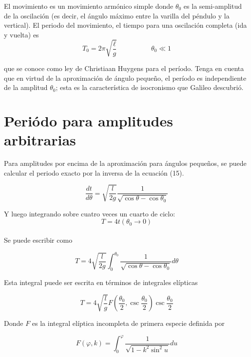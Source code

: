 \documentclass[12pt]{article}
\begin{document}
El movimiento es un movimiento armónico simple donde $\theta_0$ es la semi-amplitud de la oscilación (es decir, el ángulo máximo entre la varilla del péndulo y la vertical). El periodo del movimiento, el tiempo para una oscilación completa (ida y vuelta) es
\begin{equation}
T_0 = 2 \pi \sqrt {\frac {\ell} {g}} \quad \quad \quad \quad \quad \theta_0 \ll 1
\end{equation}

que se conoce como ley de Christiaan Huygens para el período. Tenga en cuenta que en virtud de la aproximación de ángulo pequeño, el período es independiente de la amplitud $\theta_0$; esta es la característica de isocronismo que Galileo descubrió.
\section{Periódo para amplitudes arbitrarias}
Para amplitudes por encima de la aproximación para ángulos pequeños, se puede calcular el periodo exacto por la inversa de la ecuación (15).

\begin{equation}
\frac{dt}{d\theta}= \sqrt{\frac{l}{2g}} \frac{1}{\sqrt{\cos\theta - \cos \theta_0}}
\end{equation}
 
Y luego integrando sobre cuatro veces un cuarto de ciclo:\\
 
$$T=4t(\theta_0 \rightarrow 0)$$\\

Se puede escribir como

\begin{equation}
T= 4\sqrt{\frac{l}{2g}} \int_0^{\theta_0} \frac{1}{\sqrt{\cos\theta - \cos \theta_0}} d\theta
\end{equation}

Esta integral puede ser escrita en términos de integrales elípticas 

\begin{equation}
T=4\sqrt{\frac{l}{g}} F \left(\frac{\theta_0}{2},\csc\frac{\theta_0}{2}\right)\csc\frac{\theta_0}{2}
\end{equation}

Donde $F$ es la integral elíptica incompleta de primera especie definida por

\begin{equation}
F(\varphi , k)= \int_0^{\varphi} \frac{1}{\sqrt{1-k^2 \sin^2 u}}du
\end{equation}
\end{document}
